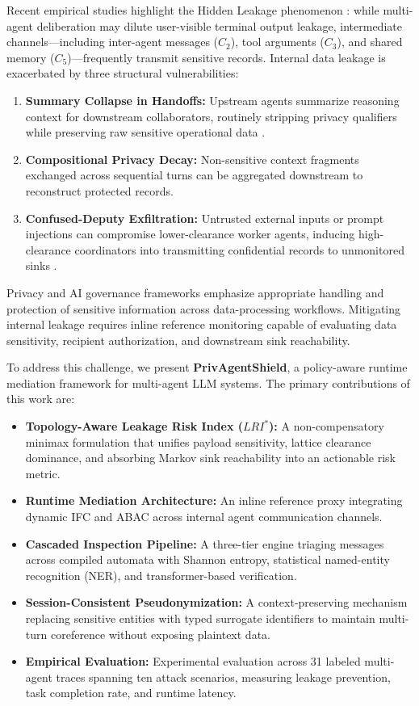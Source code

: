 \documentclass[conference]{IEEEtran}
\begin{document}
Recent empirical studies highlight the Hidden Leakage phenomenon \cite{1}: while multi-agent deliberation may dilute user-visible terminal output leakage, intermediate channels---including inter-agent messages ($C_2$), tool arguments ($C_3$), and shared memory ($C_5$)---frequently transmit sensitive records. Internal data leakage is exacerbated by three structural vulnerabilities:
\begin{enumerate}
    \item \textbf{Summary Collapse in Handoffs:} Upstream agents summarize reasoning context for downstream collaborators, routinely stripping privacy qualifiers while preserving raw sensitive operational data \cite{4}.
    \item \textbf{Compositional Privacy Decay:} Non-sensitive context fragments exchanged across sequential turns can be aggregated downstream to reconstruct protected records.
    \item \textbf{Confused-Deputy Exfiltration:} Untrusted external inputs or prompt injections \cite{7} can compromise lower-clearance worker agents, inducing high-clearance coordinators into transmitting confidential records to unmonitored sinks \cite{2}.
\end{enumerate}

Privacy and AI governance frameworks emphasize appropriate handling and protection of sensitive information across data-processing workflows. Mitigating internal leakage requires inline reference monitoring capable of evaluating data sensitivity, recipient authorization, and downstream sink reachability.

To address this challenge, we present \textbf{PrivAgentShield}, a policy-aware runtime mediation framework for multi-agent LLM systems. The primary contributions of this work are:
\begin{itemize}
    \item \textbf{Topology-Aware Leakage Risk Index ($LRI^*$):} A non-compensatory minimax formulation that unifies payload sensitivity, lattice clearance dominance, and absorbing Markov sink reachability into an actionable risk metric.
    \item \textbf{Runtime Mediation Architecture:} An inline reference proxy integrating dynamic IFC and ABAC across internal agent communication channels.
    \item \textbf{Cascaded Inspection Pipeline:} A three-tier engine triaging messages across compiled automata with Shannon entropy, statistical named-entity recognition (NER), and transformer-based verification.
    \item \textbf{Session-Consistent Pseudonymization:} A context-preserving mechanism replacing sensitive entities with typed surrogate identifiers to maintain multi-turn coreference without exposing plaintext data.
    \item \textbf{Empirical Evaluation:} Experimental evaluation across 31 labeled multi-agent traces spanning ten attack scenarios, measuring leakage prevention, task completion rate, and runtime latency.
\end{itemize}
\end{document}
